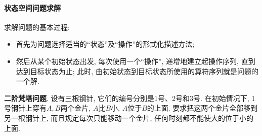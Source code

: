 \paragraph{状态空间问题求解}
求解问题的基本过程:
\begin{itemize}
\item 首先为问题选择适当的“状态”及“操作”的形式化描述方法;
\item 然后从某个初始状态出发, 每次使用一个“操作”, 递增地建立起操作序列, 直到达到目标状态为止; 此时, 由初始状态到目标状态所使用的算符序列就是问题的一个解.
\end{itemize}
\begin{example}
  \textbf{二阶梵塔问题}. 设有三根钢针, 它们的编号分别是1号、2号和3号. 在初始情况下, 1号钢针上穿有$A,B$两个金片, $A$比$B$小, $A$位于$B$的上面. 要求把这两个金片全部移到另一根钢针上, 而且规定每次只能移动一个金片, 任何时刻都不能使大的位于小的上面.
\end{example}
